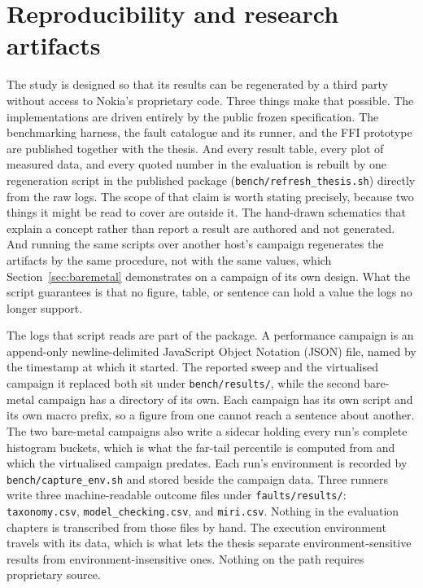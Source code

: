 \documentclass[english,oneside,a4paper,censored,csm,software-track-2020]{HYthesisML}
\begin{document}
\section{Reproducibility and research artifacts}\label{sec:repro}
The study is designed so that its results can be regenerated by a third party without access to
Nokia's proprietary code. Three things make that possible. The implementations are driven
entirely by the public frozen specification. The benchmarking harness, the fault catalogue and
its runner, and the FFI prototype are published together with the thesis. And every result table,
every plot of measured data, and every quoted number in the evaluation is rebuilt by one
regeneration script in the published package (\texttt{bench/refresh\_thesis.sh}) directly from the
raw logs. The scope of that claim is worth stating precisely, because two things it might be read to
cover are outside it. The hand-drawn schematics that explain a concept rather than report a result
are authored and not generated. And running the same scripts over another host's campaign
regenerates the artifacts by the same procedure, not with the same values, which
Section~\ref{sec:baremetal} demonstrates on a campaign of its own design. What the script
guarantees is that no figure, table, or sentence can hold a value the logs no longer support.

The logs that script reads are part of the package. A performance campaign is an append-only
newline-delimited JavaScript Object Notation (JSON) file, named by the timestamp at which it
started. The reported sweep and
the virtualised campaign it replaced both sit under \texttt{bench/results/}, while the second
bare-metal campaign has a directory of its own. Each campaign has its own script and its own
macro prefix, so a figure from one cannot reach a sentence about another. The two bare-metal
campaigns also write a sidecar holding every run's complete histogram buckets, which is what the
far-tail percentile is computed from and which the virtualised campaign predates. Each run's
environment is recorded by \texttt{bench/capture\_env.sh} and stored beside the campaign data.
Three runners write three machine-readable outcome files under \texttt{faults/results/}:
\texttt{taxonomy.csv}, \texttt{model\_checking.csv}, and \texttt{miri.csv}. Nothing in the
evaluation chapters is transcribed from those files by hand. The execution environment travels
with its data, which is what lets the thesis separate environment-sensitive results from
environment-insensitive ones. Nothing on the path requires proprietary source.
\end{document}
